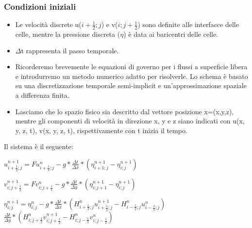 \documentclass{beamer}
\begin{document}
	\begin{frame}
		\frametitle{Condizioni iniziali}
		\begin{itemize}
		\item Le velocità discrete u($i+\frac{1}{2} ; j $) e v($ i ; j+\frac{1}{2}$) sono definite alle interfacce delle celle, mentre la pressione discreta ($\eta$) è data ai baricentri delle celle.\\
		\item $\Delta$t rappresenta il passo temporale.
		\smallskip
		
		\item Ricorderemo brevemente le equazioni di governo per i flussi a superficie libera e introdurremo un metodo numerico adatto per risolverle. Lo schema è basato su una discretizzazione temporale semi-implicit e un'approssimazione spaziale a differenza finita.
		\item Lasciamo che lo spazio fisico sia descritto dal vettore posizione x=(x,y,z), mentre gli componenti di velocità in direzione x, y e z siano indicati con u(x, y, z, t), v(x, y, z, t), rispettivamente con t inizia il tempo.
		\end{itemize}
	\end{frame}


	\begin{frame}
		Il sistema è il seguente:\\
		\begin{center}
	
			$ u_{i + \frac{1}{2} ; j}^{n+1} = Fu_{i + \frac{1}{2}; j} ^{n}  - g*\frac{\Delta t}{\Delta x} *( \eta_{i+1; j} ^{n+1} -\eta_{i; j} ^{n+1}) $
			
			$ v_{i ; j + \frac{1}{2}}^{n+1} = Fv_{i;j  + \frac{1}{2}} ^{n}  - g*\frac{\Delta t}{\Delta y} *( \eta_{i; j+1} ^{n+1} -\eta_{i; j} ^{n+1}) $
				
				$ \eta_{i ; j}^{n+1} = \eta_{i ;j} ^{n}  - g*\frac{\Delta t}{\Delta x} *( H_{i+ \frac{1}{2} ; j}^n u_{i+\frac{1}{2};j}^{n+1} - H_{i-\frac{1}{2};j}^{n} u_{i-\frac{1}{2};j}^{n}) $ \\
				$\frac{\Delta t}{\Delta y} *( H_{i; j+ \frac{1}{2}}^{n} v_{i; j+\frac{1}{2}}^{n+1} - H_{i;j-\frac{1}{2}}^{n} v_{i;j-\frac{1}{2}}^{n}) $ 
		\end{center}

	\end{frame}
\end{document}

